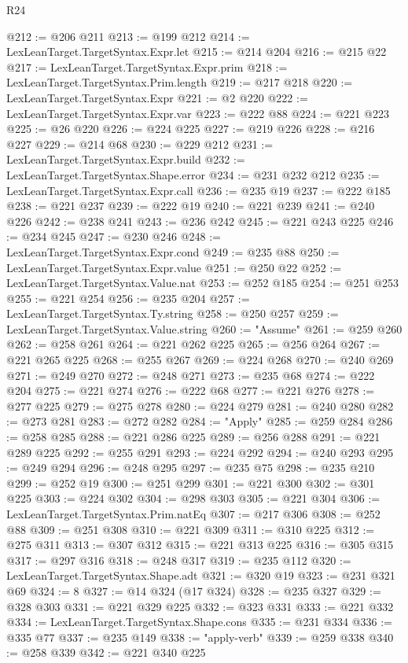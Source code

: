 \begin{lexlean}{R24}
\begin{coremodule}
@212 := @206 @211
@213 := @199 @212
@214 := LexLeanTarget.TargetSyntax.Expr.let
@215 := @214 @204
@216 := @215 @22
@217 := LexLeanTarget.TargetSyntax.Expr.prim
@218 := LexLeanTarget.TargetSyntax.Prim.length
@219 := @217 @218
@220 := LexLeanTarget.TargetSyntax.Expr
@221 := @2 @220
@222 := LexLeanTarget.TargetSyntax.Expr.var
@223 := @222 @88
@224 := @221 @223
@225 := @26 @220
@226 := @224 @225
@227 := @219 @226
@228 := @216 @227
@229 := @214 @68
@230 := @229 @212
@231 := LexLeanTarget.TargetSyntax.Expr.build
@232 := LexLeanTarget.TargetSyntax.Shape.error
@234 := @231 @232 @212
@235 := LexLeanTarget.TargetSyntax.Expr.call
@236 := @235 @19
@237 := @222 @185
@238 := @221 @237
@239 := @222 @19
@240 := @221 @239
@241 := @240 @226
@242 := @238 @241
@243 := @236 @242
@245 := @221 @243 @225
@246 := @234 @245
@247 := @230 @246
@248 := LexLeanTarget.TargetSyntax.Expr.cond
@249 := @235 @88
@250 := LexLeanTarget.TargetSyntax.Expr.value
@251 := @250 @22
@252 := LexLeanTarget.TargetSyntax.Value.nat
@253 := @252 @185
@254 := @251 @253
@255 := @221 @254
@256 := @235 @204
@257 := LexLeanTarget.TargetSyntax.Ty.string
@258 := @250 @257
@259 := LexLeanTarget.TargetSyntax.Value.string
@260 := "Assume"
@261 := @259 @260
@262 := @258 @261
@264 := @221 @262 @225
@265 := @256 @264
@267 := @221 @265 @225
@268 := @255 @267
@269 := @224 @268
@270 := @240 @269
@271 := @249 @270
@272 := @248 @271
@273 := @235 @68
@274 := @222 @204
@275 := @221 @274
@276 := @222 @68
@277 := @221 @276
@278 := @277 @225
@279 := @275 @278
@280 := @224 @279
@281 := @240 @280
@282 := @273 @281
@283 := @272 @282
@284 := "Apply"
@285 := @259 @284
@286 := @258 @285
@288 := @221 @286 @225
@289 := @256 @288
@291 := @221 @289 @225
@292 := @255 @291
@293 := @224 @292
@294 := @240 @293
@295 := @249 @294
@296 := @248 @295
@297 := @235 @75
@298 := @235 @210
@299 := @252 @19
@300 := @251 @299
@301 := @221 @300
@302 := @301 @225
@303 := @224 @302
@304 := @298 @303
@305 := @221 @304
@306 := LexLeanTarget.TargetSyntax.Prim.natEq
@307 := @217 @306
@308 := @252 @88
@309 := @251 @308
@310 := @221 @309
@311 := @310 @225
@312 := @275 @311
@313 := @307 @312
@315 := @221 @313 @225
@316 := @305 @315
@317 := @297 @316
@318 := @248 @317
@319 := @235 @112
@320 := LexLeanTarget.TargetSyntax.Shape.adt
@321 := @320 @19
@323 := @231 @321 @69
@324 := 8
@327 := @14 @324 (@17 @324)
@328 := @235 @327
@329 := @328 @303
@331 := @221 @329 @225
@332 := @323 @331
@333 := @221 @332
@334 := LexLeanTarget.TargetSyntax.Shape.cons
@335 := @231 @334
@336 := @335 @77
@337 := @235 @149
@338 := "apply-verb"
@339 := @259 @338
@340 := @258 @339
@342 := @221 @340 @225

\end{coremodule}
\end{lexlean}
